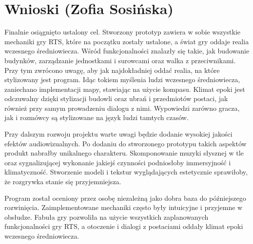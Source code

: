 \section{Wnioski (Zofia Sosińska)}
Finalnie osiągnięto ustalony cel. Stworzony prototyp zawiera w sobie wszystkie mechaniki gry RTS,
które na początku zostały ustalone, a świat gry oddaje realia wczesnego średniowiecza. 
Wśród funkcjonalności znalazły się takie, jak budowanie budynków, zarządzanie
jednostkami i surowcami oraz walka z przeciwnikami. Przy tym zwrócono uwagę, aby jak najdokładniej oddać 
realia, na które stylizowany jest program. Idąc tokiem myślenia ludzi wczesnego średniowiecza, zaniechano
implementacji mapy, stawiając na użycie kompasu. Klimat epoki jest odczuwalny dzięki stylizacji budowli oraz ubrań i przedmiotów postaci,
jak również przy samym prowadzeniu dialogu z nimi. Wypowiedzi zarówno gracza, jak i rozmówcy są stylizowane na język ludzi tamtych czasów.

Przy dalszym rozwoju projektu warte uwagi będzie dodanie wysokiej jakości efektów audiowizualnych. Po dodaniu do stworzonego prototypu takich
aspektów produkt nabrałby unikalnego charakteru. Skomponowanie muzyki słysznej w tle oraz sygnalizującej wykonanie jakiejś czynności podniosłoby immersyjność i klimatyczność.
Stworzenie modeli i tekstur wyglądających estetycznie sprawiłoby, że rozgrywka stanie się przyjemniejsza.

Program został oceniony przez osobę niezależną jako dobra baza do późniejszego rozwinięcia. Zaimplementowane mechaniki często były intuicyjne i przyjemne
w obsłudze. Fabuła gry pozwoliła na użycie wszystkich zaplanowanych funkcjonalności gry RTS, a otoczenie i dialogi z postaciami oddały klimat
epoki wczesnego średniowiecza.